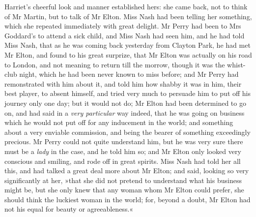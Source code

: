 Harriet's cheerful look and manner established hers: she came back, not to think of Mr Martin, but to talk of Mr Elton. Miss Nash had been telling her something, which she repeated immediately with great delight. Mr Perry had been to Mrs Goddard's to attend a sick child, and Miss Nash had seen him, and he had told Miss Nash, that as he was coming back yesterday from Clayton Park, he had met Mr Elton, and found to his great surprize, that Mr Elton was actually on his road to London, and not meaning to return till the morrow, though it was the whist-club night, which he had been never known to miss before; and Mr Perry had remonstrated with him about it, and told him how shabby it was in him, their best player, to absent himself, and tried very much to persuade him to put off his journey only one day; but it would not do; Mr Elton had been determined to go on, and had said in a \textit{very particular} way indeed, that he was going on business which he would not put off for any inducement in the world; and something about a very enviable commission, and being the bearer of something exceedingly precious. Mr Perry could not quite understand him, but he was very sure there must be a \textit{lady} in the case, and he told him so; and Mr Elton only looked very conscious and smiling, and rode off in great spirits. Miss Nash had told her all this, and had talked a great deal more about Mr Elton; and said, looking so very significantly at her, »that she did not pretend to understand what his business might be, but she only knew that any woman whom Mr Elton could prefer, she should think the luckiest woman in the world; for, beyond a doubt, Mr Elton had not his equal for beauty or agreeableness.«